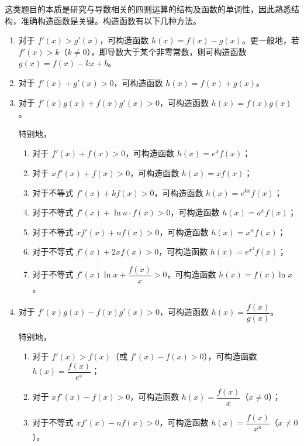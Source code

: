 \documentclass{article}
\begin{document}
\newpage
\begin{tcolorbox}[
    colback=white,
    colframe=black,
    boxrule=0.8pt,
    left=10pt,
    right=10pt,
    top=10pt,
    bottom=10pt
]
这类题目的本质是研究与导数相关的四则运算的结构及函数的单调性，因此熟悉结构，准确构造函数是关键。构造函数有以下几种方法。

\begin{enumerate}
    \item 对于 \(f'(x) > g'(x)\)，可构造函数 \(h(x) = f(x) - g(x)\)。更一般地，若 \(f'(x) > k\)（\(k \neq 0\)），即导数大于某个非零常数，则可构造函数 \(g(x) = f(x) - kx + b\)。

    \item 对于 \(f'(x) + g'(x) > 0\)，可构造函数 \(h(x) = f(x) + g(x)\)。

    \item 对于 \(f'(x)g(x) + f(x)g'(x) > 0\)，可构造函数 \(h(x) = f(x)g(x)\)。

    特别地，
    \begin{enumerate}
        \item 对于 \(f'(x) + f(x) > 0\)，可构造函数 \(h(x) = e^x f(x)\)；
        \item 对于 \(xf'(x) + f(x) > 0\)，可构造函数 \(h(x) = xf(x)\)；
        \item 对于不等式 \(f'(x) + kf(x) > 0\)，可构造函数 \(h(x) = e^{kx}f(x)\)；
        \item 对于不等式 \(f'(x) + \ln a \cdot f(x) > 0\)，可构造函数 \(h(x) = a^x f(x)\)；
        \item 对于不等式 \(xf'(x) + nf(x) > 0\)，可构造函数 \(h(x) = x^n f(x)\)；
        \item 对于不等式 \(f'(x) + 2xf(x) > 0\)，可构造函数 \(h(x) = e^{x^2}f(x)\)；
        \item 对于不等式 \(f'(x)\ln x + \dfrac{f(x)}{x} > 0\)，可构造函数 \(h(x) = f(x)\ln x\)。
    \end{enumerate}

    \item 对于 \(f'(x)g(x) - f(x)g'(x) > 0\)，可构造函数 \(h(x) = \dfrac{f(x)}{g(x)}\)。

    特别地，
    \begin{enumerate}
        \item 对于 \(f'(x) > f(x)\)（或 \(f'(x) - f(x) > 0\)），可构造函数 \(h(x) = \dfrac{f(x)}{e^x}\)；
        \item 对于 \(xf'(x) - f(x) > 0\)，可构造函数 \(h(x) = \dfrac{f(x)}{x}\)（\(x \neq 0\)）；
        \item 对于不等式 \(xf'(x) - nf(x) > 0\)，可构造函数 \(h(x) = \dfrac{f(x)}{x^n}\)（\(x \neq 0\)）。
    \end{enumerate}
\end{enumerate}
\end{tcolorbox}
\end{document}
